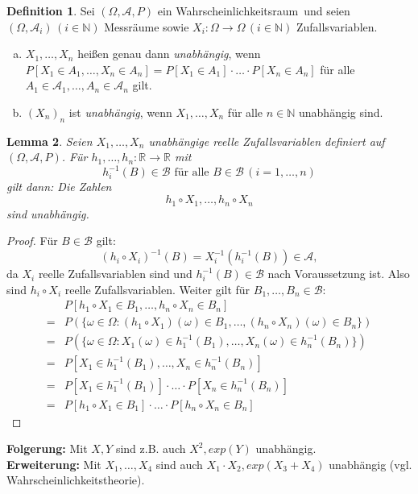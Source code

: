 \documentclass[a4paper,12pt,fleqn]{scrartcl}
\newcommand{\N}{\mathbb{N}}
\newcommand{\R}{\mathbb{R}}
\newcommand{\m}[1]{\mathcal{ #1 }}
\newcommand{\WR}{Wahrscheinlichkeitsraum}
\theoremstyle{definition}
\newtheorem{definition}{Definition}[section]
\theoremstyle{plain}
\newtheorem{lemma}[definition]{Lemma}
\theoremstyle{remark}
\begin{document}
\begin{definition}
Sei $(\Omega, \m{A}, P)$ ein \WR \, und seien $(\Omega, \m{A}_i) \, (i \in \N)$ Messräume sowie $X_i: \Omega \rightarrow  \Omega \, (i \in \N)$ Zufallsvariablen.
\begin{enumerate}[a)]
\item $X_1, \ldots , X_n$ heißen genau dann \emph{unabhängig}, wenn $P[X_1 \in A_1, \ldots , X_n \in A_n] = P[X_1 \in A_1] \cdot \ldots \cdot P[X_n \in A_n]$ für alle $A_1 \in \m{A}_1, \ldots , A_n \in \m{A}_n$ gilt.
\item $(X_n)_n$ ist \emph{unabhängig}, wenn $X_1, \ldots , X_n$ für alle $n \in \N$ unabhängig sind.
\end{enumerate}
\end{definition}
\begin{lemma}
Seien $X_1, \ldots , X_n$ unabhängige reelle Zufallsvariablen definiert auf $(\Omega, \m{A}, P)$. Für $h_1, \ldots , h_n : \R \rightarrow \R$ mit
\[h_i^{-1}(B) \in \m{B} \text{ für alle } B \in \m{B} \, (i=1, \ldots , n)\]
gilt dann: Die Zahlen
\[h_1 \circ X_1, \ldots , h_n \circ X_n\]
sind unabhängig.
\end{lemma}
\begin{proof}
Für $B \in \m{B}$ gilt:
\[(h_i \circ X_i)^{-1}(B) = X_i^{-1}(h_i^{-1}(B)) \in \m{A},\]
da $X_i$ reelle Zufallsvariablen sind und $h_i^{-1}(B) \in \m{B}$ nach Voraussetzung ist. Also sind $h_i \circ X_i$ reelle Zufallsvariablen. Weiter gilt für $B_1, \ldots , B_n \in \m{B}$:
\begin{align*}
&P[h_1 \circ X_1 \in B_1, \ldots , h_n \circ X_n \in B_n] \\
=&P(\{\omega \in \Omega : (h_1 \circ X_1)(\omega) \in B_1, \ldots , (h_n \circ X_n)(\omega) \in B_n\})\\
=&P(\{\omega \in \Omega : X_1(\omega) \in h_1^{-1}(B_1), \ldots ,X_n(\omega) \in h_n^{-1}(B_n)\})\\
=&P[X_1 \in h_1^{-1}(B_1), \ldots, X_n \in h_n^{-1}(B_n)]\\
=&P[X_1 \in h_1^{-1}(B_1)] \cdot \ldots \cdot P[X_n \in h_n^{-1}(B_n)]\\
=&P[h_1 \circ X_1 \in B_1] \cdot \ldots \cdot P[h_n \circ X_n \in B_n]
\end{align*}
\end{proof}

\textbf{Folgerung:} Mit $X, Y$ sind z.B. auch $X^2, exp(Y)$ unabhängig.\\
\textbf{Erweiterung:} Mit $X_1, \ldots , X_4$ sind auch $X_1 \cdot X_2, exp(X_3 + X_4)$ unabhängig (vgl. Wahrscheinlichkeitstheorie).
\end{document}
